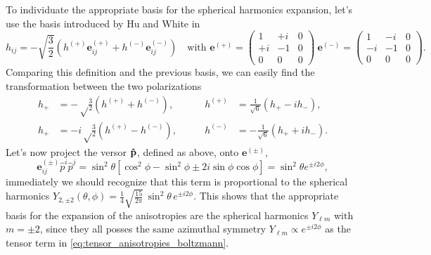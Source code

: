 To individuate the appropriate basis for the spherical harmonics expansion, let's use the basis introduced by Hu and White in \cite{HuWhite}
\begin{equation}
    \label{eq:HuWhiteBasis}
    h_{ij}=-\sqrt{\frac{3}{2}}(h^{(+)}\mathbf{e}_{ij}^{(+)}+h^{(-)}\mathbf{e}_{ij}^{(-)}) \quad \text{with } \mathbf{e}^{(+)}=\begin{pmatrix}
        1&+i&0\\+i&-1&0\\0&0&0
    \end{pmatrix}\ \mathbf{e}^{(-)}=\begin{pmatrix}
        1&-i&0\\-i&-1&0\\0&0&0
    \end{pmatrix}.
\end{equation}
Comparing this definition and the previous basis, we can easily find the transformation between the two polarizations
\begin{align*}
    h_{\boldsymbol{+}}&=-\sqrt\frac{3}{2}(h^{(+)}+h^{(-)}),\qquad &h^{(+)}&=\frac{1}{\sqrt{6}}(h_{\boldsymbol{+}}-ih_{\boldsymbol{-}}),\\ h_{\boldsymbol{+}}&=-i\sqrt\frac{3}{2}(h^{(+)}-h^{(-)}),\qquad &h^{(-)}&=-\frac{1}{\sqrt{6}}(h_{\boldsymbol{+}}+ih_{\boldsymbol{-}}).
\end{align*}
Let's now project the versor $\mathbf{\hat{p}}$, defined as above, onto $\mathbf{e}^{(\pm)}$, 
$$\mathbf{e}_{ij}^{(\pm)}\hat p^i\hat p^j=\sin^2\theta[\cos^2\phi-\sin^2\phi\pm2i\sin\phi\cos\phi]=\sin^2\theta e^{\pm i2\phi},$$
immediately we should recognize that this term is proportional to the spherical harmonics $Y_{2,\pm2}(\theta,\phi)=\frac{1}{4} \sqrt{\frac{15}{2\pi}} \, \sin^2\theta \, e^{ \pm i2\phi}$. This shows that the appropriate basis for the expansion of the anisotropies are the spherical harmonics $Y_{\ell m}$ with $m=\pm2$, since they all posses the same azimuthal symmetry $Y_{\ell m} \propto e^{\pm i2\phi}$ as the tensor term in \eqref{eq:tensor_anisotropies_boltzmann}.

